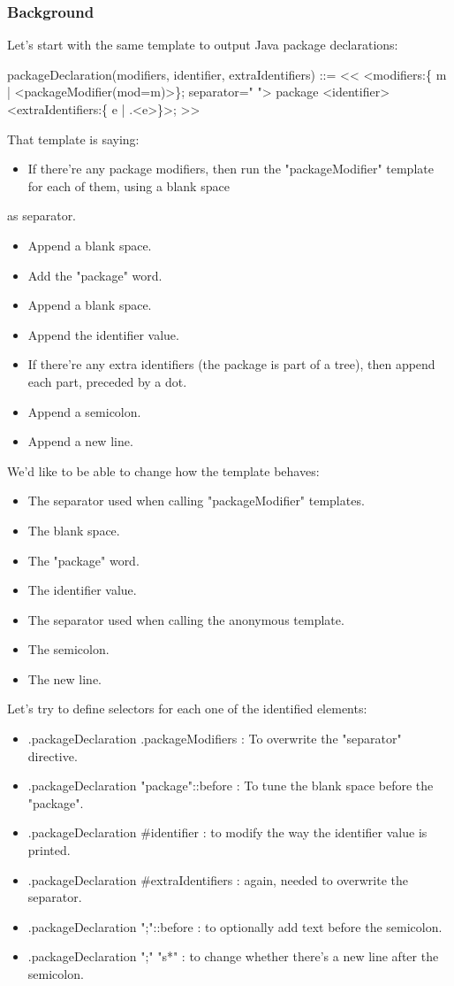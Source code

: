 \documentclass[11pt]{article}
\begin{document}
\subsubsection{Background}
\label{sec-1-4-1}

Let's start with the same template to output Java package declarations:

packageDeclaration(modifiers, identifier, extraIdentifiers) ::= <<
<modifiers:\{ m | <packageModifier(mod=m)>\}; separator=" "> package <identifier><extraIdentifiers:\{ e | .<e>\}>;
>>

That template is saying:
\begin{itemize}
\item If there're any package modifiers, then run the "packageModifier" template for each of them, using a blank space
\end{itemize}
as separator.
\begin{itemize}
\item Append a blank space.
\item Add the "package" word.
\item Append a blank space.
\item Append the identifier value.
\item If there're any extra identifiers (the package is part of a tree), then append each part, preceded by a dot.
\item Append a semicolon.
\item Append a new line.
\end{itemize}

We'd like to be able to change how the template behaves:
\begin{itemize}
\item The separator used when calling "packageModifier" templates.
\item The blank space.
\item The "package" word.
\item The identifier value.
\item The separator used when calling the anonymous template.
\item The semicolon.
\item The new line.
\end{itemize}

Let's try to define selectors for each one of the identified elements:
\begin{itemize}
\item .packageDeclaration .packageModifiers : To overwrite the "separator" directive.
\item .packageDeclaration "package"::before : To tune the blank space before the "package".
\item .packageDeclaration \#identifier : to modify the way the identifier value is printed.
\item .packageDeclaration \#extraIdentifiers : again, needed to overwrite the separator.
\item .packageDeclaration ";"::before : to optionally add text before the semicolon.
\item .packageDeclaration ";" "s*" : to change whether there's a new line after the semicolon.
\end{itemize}
\end{document}
